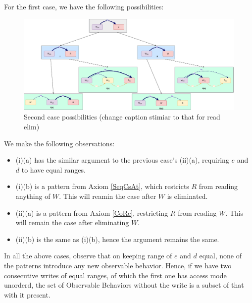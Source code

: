     For the first case, we have the following possibilities:
    \begin{figure}[H]
        \centering
        \includegraphics[scale=0.3]{6.Elimination/1.ValidEliminationCandidate/WriteElimProof/ProofParts/Part4Case2.pdf}
        \caption{Second case possibilities (change caption stimiar to that for read elim)}
    \end{figure}

    We make the following observations:
    \begin{itemize}
        \item (i)(a) has the similar argument to the previous case's (ii)(a), requiring $e$ and $d$ to have equal ranges.
        \item (i)(b) is a pattern from Axiom \ref{SeqCsAt}, which restricts $R$ from reading anything of $W$. This will reamin the case after $W$ is eliminated. 
        \item (ii)(a) is a pattern from Axiom \ref{CoRe}, restricting $R$ from reading $W$. This will remain the case after eliminating $W$.
        \item (ii)(b) is the same as (i)(b), hence the argument remains the same.  
    \end{itemize}

    In all the above cases, observe that on keeping range of $e$ and $d$ equal, none of the patterns introduce any new observable behavior. Hence, if we have two consecutive writes of equal ranges, of which the first one has access mode unorderd, the set of Observable Behaviors without the write is a subset of that with it present. 

